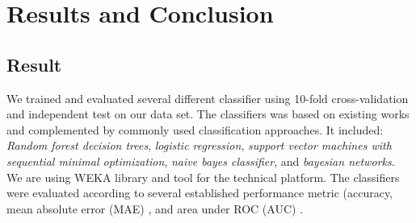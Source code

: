 \section{Results and Conclusion}
\label{sec:conclusion}

\subsection{Result}
\label{sec:results}

We trained and evaluated several different classifier using 10-fold cross-validation and independent test on our data set. The classifiers was based on existing works and complemented by commonly used classification approaches. It included: \textit{Random forest decision trees}, \textit{logistic regression}, \textit{support vector machines with sequential minimal optimization}, \textit{naive bayes classifier}, and \textit{bayesian networks}. We are using WEKA library and tool for the technical platform. The classifiers were evaluated according to several established performance metric (accuracy, mean absolute error (MAE) \cite{willmott2005advantages}, and area under ROC (AUC) \cite{huang2005using}.

